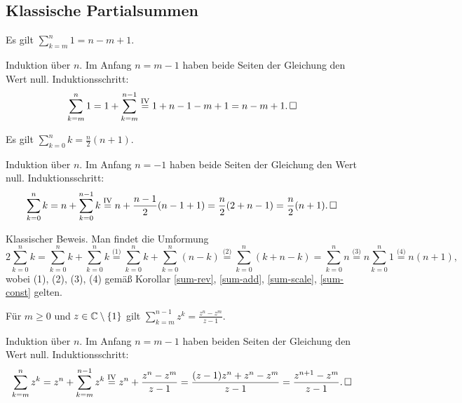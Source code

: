 \newpage
\subsection{Klassische Partialsummen}

\begin{Korollar}%
\label{sum-const}\newlinefirst
Es gilt $\displaystyle\sum_{k=m}^n 1 = n-m+1$.
\end{Korollar}
\begin{Beweis}
Induktion über $n$. Im Anfang $n=m-1$ haben beide Seiten
der Gleichung den Wert null. Induktionsschritt:
\[\sum_{k=m}^n 1 = 1 + \sum_{k=m}^{n-1}
\stackrel{\mathrm{IV}}= 1 + n-1-m+1 = n-m+1.\,\square\]
\end{Beweis}

\begin{Satz}\newlinefirst
Es gilt $\displaystyle\sum_{k=0}^n k = \frac{n}{2}(n+1)$.
\end{Satz}
\begin{Beweis}[Beweis 1]
Induktion über $n$. Im Anfang $n=-1$ haben beide Seiten der Gleichung
den Wert null. Induktionsschritt:
\[\sum_{k=0}^n k = n + \sum_{k=0}^{n-1} k
\stackrel{\mathrm{IV}}= n + \frac{n-1}{2}(n-1+1)
= \frac{n}{2}(2 + n-1) = \frac{n}{2}(n+1).\,\square\]
\end{Beweis}
\begin{Beweis}[Beweis 2]
Klassischer Beweis. Man findet die Umformung
\[2\!\sum_{k=0}^n k = \!\sum_{k=0}^n k + \!\sum_{k=0}^n k
\stackrel{\text{(1)}}= \!\sum_{k=0}^n k + \!\sum_{k=0}^n (n-k)
\stackrel{\text{(2)}}= \!\sum_{k=0}^n (k+n-k)
= \!\sum_{k=0}^n n \stackrel{\text{(3)}}= n\!\sum_{k=0}^n 1
\stackrel{\text{(4)}}= n(n+1),\]
wobei (1), (2), (3), (4) gemäß Korollar
\ref{sum-rev}, \ref{sum-add}, \ref{sum-scale}, \ref{sum-const}
gelten.\,\qedsymbol
\end{Beweis}

\begin{Satz}%
\label{sum-geom-seq}\newlinefirst
Für $m\ge 0$ und $z\in\mathbb C\setminus\{1\}$ gilt
$\displaystyle\sum_{k=m}^{n-1} z^k = \frac{z^n-z^m}{z-1}$.
\end{Satz}
\begin{Beweis}
Induktion über $n$. Im Anfang $n=m-1$ haben beiden Seiten der Gleichung
den Wert null. Induktionsschritt:
\[\sum_{k=m}^n z^k = z^n + \sum_{k=m}^{n-1} z^k
\stackrel{\mathrm{IV}}= z^n + \frac{z^n-z^m}{z-1}
= \frac{(z-1)z^n+z^n-z^m}{z-1}
= \frac{z^{n+1}-z^m}{z-1}.\,\square\]
\end{Beweis}

